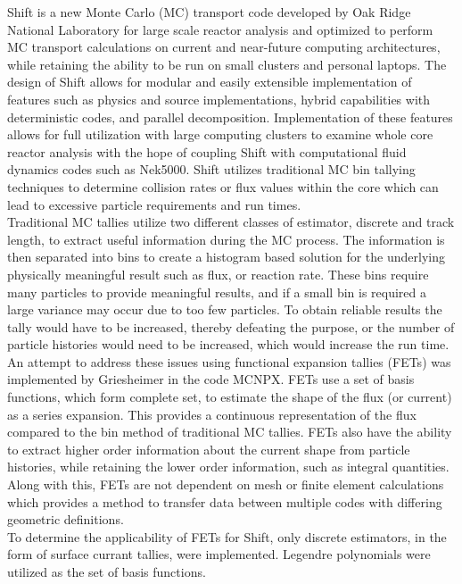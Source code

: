 \documentclass[10tma4paper]{article}
\begin{document}
 Shift is a new Monte Carlo (MC) transport code developed by Oak Ridge National Laboratory for large scale reactor analysis and optimized to perform MC transport calculations on current and near-future computing architectures, while retaining the ability to be run on small clusters and personal laptops. The design of Shift allows for modular and easily extensible implementation of features such as physics and source implementations, hybrid capabilities with deterministic codes, and parallel decomposition. Implementation of these features allows for full utilization with large computing clusters to examine whole core reactor analysis with the hope of coupling Shift with computational fluid dynamics codes such as Nek5000. Shift utilizes traditional MC bin tallying techniques to determine collision rates or flux values within the core which can lead to excessive particle requirements and run times.
\\
Traditional MC tallies utilize two different classes of estimator, discrete and track length, to extract useful information during the MC process. The information is then separated into bins to create a histogram based solution for the underlying physically meaningful result such as flux, or reaction rate. These bins require many particles to provide meaningful results, and if a small bin is required a large variance may occur due to too few particles. To obtain reliable results the tally would have to be increased, thereby defeating the purpose, or the number of particle histories would need to be increased, which would increase the run time.
\\
An attempt to address these issues using functional expansion tallies (FETs) was implemented by Griesheimer in the code MCNPX. FETs use a set of basis functions, which form complete set, to estimate the shape of the flux (or current) as a series expansion. This provides a continuous representation of the flux compared to the bin method of traditional MC tallies. FETs also have the ability to extract higher order information about the current shape from particle histories, while retaining the lower order information, such as integral quantities. Along with this, FETs are not dependent on mesh or finite element calculations which provides a method to transfer data between multiple codes with differing geometric definitions.  
\\
To determine the applicability of FETs for Shift, only discrete estimators, in the form of surface currant tallies, were implemented. Legendre polynomials were utilized as the set of basis functions.
\end{document}
